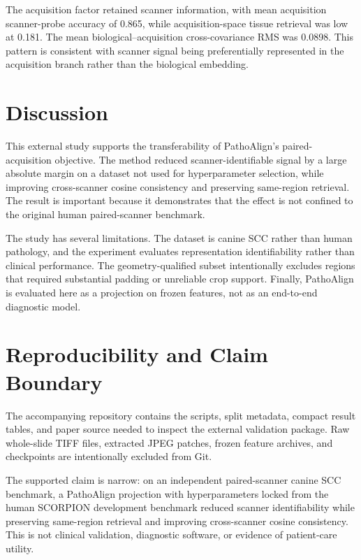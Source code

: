 \documentclass[10pt]{article}
\begin{document}
The acquisition factor retained scanner information, with mean acquisition scanner-probe accuracy of 0.865, while acquisition-space tissue retrieval was low at 0.181. The mean biological--acquisition cross-covariance RMS was 0.0898. This pattern is consistent with scanner signal being preferentially represented in the acquisition branch rather than the biological embedding.

\section{Discussion}

This external study supports the transferability of PathoAlign's paired-acquisition objective. The method reduced scanner-identifiable signal by a large absolute margin on a dataset not used for hyperparameter selection, while improving cross-scanner cosine consistency and preserving same-region retrieval. The result is important because it demonstrates that the effect is not confined to the original human paired-scanner benchmark.

The study has several limitations. The dataset is canine SCC rather than human pathology, and the experiment evaluates representation identifiability rather than clinical performance. The geometry-qualified subset intentionally excludes regions that required substantial padding or unreliable crop support. Finally, PathoAlign is evaluated here as a projection on frozen features, not as an end-to-end diagnostic model.

\section{Reproducibility and Claim Boundary}

The accompanying repository contains the scripts, split metadata, compact result tables, and paper source needed to inspect the external validation package. Raw whole-slide TIFF files, extracted JPEG patches, frozen feature archives, and checkpoints are intentionally excluded from Git.

The supported claim is narrow: on an independent paired-scanner canine SCC benchmark, a PathoAlign projection with hyperparameters locked from the human SCORPION development benchmark reduced scanner identifiability while preserving same-region retrieval and improving cross-scanner cosine consistency. This is not clinical validation, diagnostic software, or evidence of patient-care utility.

\clearpage
\onecolumn
\RaggedRight
\setlength{\parindent}{0pt}
\setlength{\parskip}{0.35em}
\end{document}
